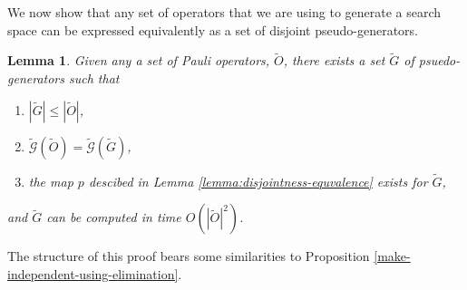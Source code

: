 \documentclass[twocolumn,showpacs,preprintnumbers,amsmath,amssymb,nofootinbib,pra,floatfix]{revtex4-1}
\newtheorem{lemma}{Lemma}
\newenvironment{remark}[1][Remark]{\begin{trivlist}
\item[\hskip \labelsep {\bfseries #1}]}{\end{trivlist}}
\newcommand{\set}{\tilde}
\newcommand{\genfun}{\tilde{\mathcal{G}}}
\begin{document}
\begin{remark}
We now show that any set of operators that we are using to generate a search space can be expressed equivalently as a set of disjoint pseudo-generators.
\end{remark}

\begin{lemma}
\label{lemma:computing-disjoint-pseudo-generators}
Given any a set of Pauli operators, $\set O$, there exists a set $\set G$ of psuedo-generators such that
\begin{enumerate}
\item $|\set G|\le|\set O|$,
\item $\genfun(\set O)=\genfun(\set G)$,
\item the map $p$ descibed in Lemma \ref{lemma:disjointness-equvalence} exists for $\set G$,
\end{enumerate}
and $\set G$ can be computed in time $O(|\set O|^2)$.
\end{lemma}

\begin{remark}
The structure of this proof bears some similarities to Proposition \ref{make-independent-using-elimination}.
\end{remark}
\end{document}
